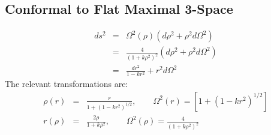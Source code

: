 \documentclass[10pt,letterpaper]{article}
\numberwithin{equation}{section}
\begin{document}
\newpage
\begin{appendices}
\section{Conformal to Flat Maximal 3-Space}
\begin{eqnarray}
ds^2 &=& \Omega^2(\rho)\left( d\rho^2 + \rho^2 d\Omega^2\right)
\nonumber\\
&=& \frac{4}{\left(1+k\rho^2\right)^2}\left( d\rho^2 + \rho^2 d\Omega^2\right)
\nonumber\\
&=& \frac{dr^2}{1-kr^2} + r^2 d\Omega^2
\label{dscf}
\end{eqnarray}
The relevant transformations are:
\begin{eqnarray}
\rho(r) &=& \frac{r}{1+\left(1-kr^2\right)^{1/2}},\qquad \Omega^2(r) = \left[1+\left(1-kr^2\right)^{1/2}\right]
\nonumber\\
r(\rho) &=& \frac{2\rho}{1+k\rho^2},\qquad \Omega^2(\rho) = \frac{4}{\left(1+k\rho^2\right)^2}
\end{eqnarray}




\end{appendices}
\end{document}
